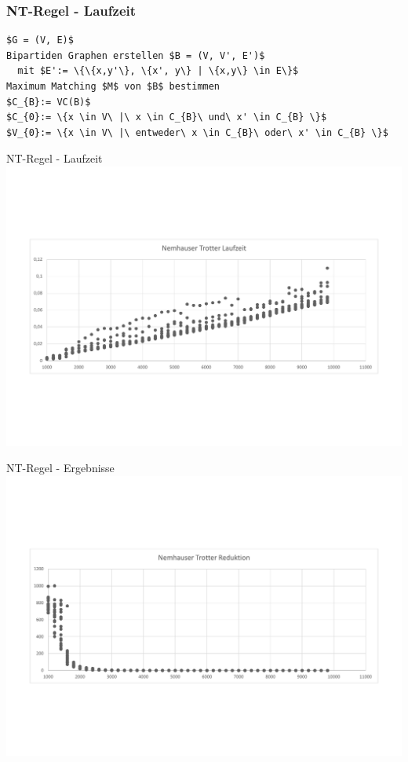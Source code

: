 \documentclass{beamer}
\begin{document}
\begin{frame}[fragile]
\frametitle{NT-Regel - Laufzeit}
\begin{lstlisting}[mathescape = true, basicstyle=\ttfamily]
$G = (V, E)$
Bipartiden Graphen erstellen $B = (V, V', E')$ 
  mit $E':= \{\{x,y'\}, \{x', y\} | \{x,y\} \in E\}$ 
Maximum Matching $M$ von $B$ bestimmen 
$C_{B}:= VC(B)$ 
$C_{0}:= \{x \in V\ |\ x \in C_{B}\ und\ x' \in C_{B} \}$ 
$V_{0}:= \{x \in V\ |\ entweder\ x \in C_{B}\ oder\ x' \in C_{B} \}$ 
\end{lstlisting}
\end{frame}
\begin{frame}{NT-Regel - Laufzeit}
\includegraphics[scale= .4]{analysis1000_TrottNormal_runtime.pdf} 
\end{frame}
\begin{frame}{NT-Regel - Ergebnisse}
\includegraphics[scale= .4]{analysisTrott.pdf} 
\end{frame}
\end{document}
